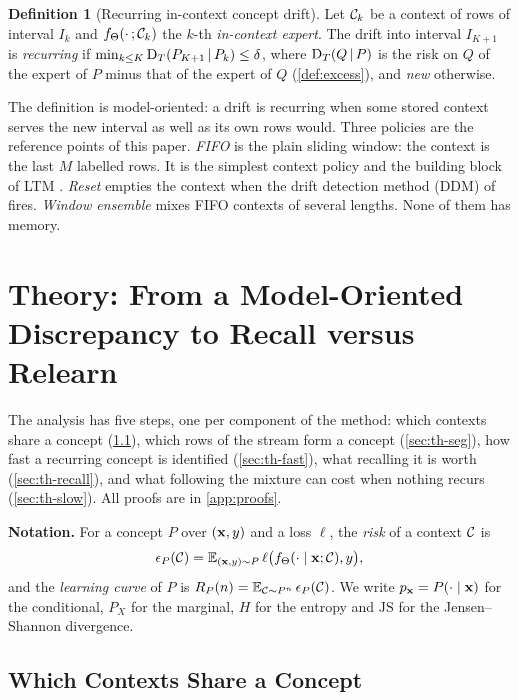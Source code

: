 \documentclass[11pt]{article}
\theoremstyle{plain}
\theoremstyle{definition}
\newtheorem{definition}{Definition}
\theoremstyle{remark}
\begin{document}
\begin{definition}[Recurring in-context concept drift]\label{def:recur}
Let $\mathcal{C}_k$ be a context of rows of interval $I_k$ and $f_\Theta(\cdot\,;\mathcal{C}_k)$ the $k$-th \emph{in-context expert}.
The drift into interval $I_{K+1}$ is \emph{recurring} if $\min_{k\le K}\mathrm{D}_T(P_{K+1}\,|\,P_k)\le\delta$, where
$\mathrm{D}_T(Q\,|\,P)$ is the risk on $Q$ of the expert of $P$ minus that of the expert of $Q$ (\cref{def:excess}), and
\emph{new} otherwise.
\end{definition}

The definition is model-oriented: a drift is recurring when some stored context serves the new interval as well as
its own rows would. Three policies are the reference points of this paper. \emph{FIFO} is the plain sliding window: the context is the last $M$ labelled rows. It is the
simplest context policy and the building block of LTM \citep{lourenco2026streams}. \emph{Reset} empties the context when the drift detection method (DDM) of
\citet{gama2004ddm} fires. \emph{Window ensemble} mixes FIFO contexts of several lengths. None of them has memory.

\section{Theory: From a Model-Oriented Discrepancy to Recall versus Relearn}
\label{sec:theory}

The analysis has five steps, one per component of the method: which contexts share a concept
(\cref{sec:th-disc}), which rows of the stream form a concept (\cref{sec:th-seg}), how fast a recurring concept is
identified (\cref{sec:th-fast}), what recalling it is worth (\cref{sec:th-recall}), and what following the mixture
can cost when nothing recurs (\cref{sec:th-slow}). All proofs
are in \cref{app:proofs}.

\textbf{Notation.} For a concept $P$ over $(\mathbf{x},y)$ and a loss $\ell$, the \emph{risk} of a context $\mathcal{C}$ is
\[
  \epsilon_P(\mathcal{C})=\mathbb{E}_{(\mathbf{x},y)\sim P}\,\ell\bigl(f_\Theta(\cdot\mid\mathbf{x};\mathcal{C}),y\bigr),
\]
and the \emph{learning curve} of $P$ is $R_P(n)=\mathbb{E}_{\mathcal{C}\sim P^n}\,\epsilon_P(\mathcal{C})$. We write $p_{\mathbf{x}}=P(\cdot\mid\mathbf{x})$
for the conditional, $P_X$ for the marginal, $H$ for the entropy and $\mathrm{JS}$ for the Jensen--Shannon
divergence.

\subsection{Which Contexts Share a Concept}
\label{sec:th-disc}
\end{document}
